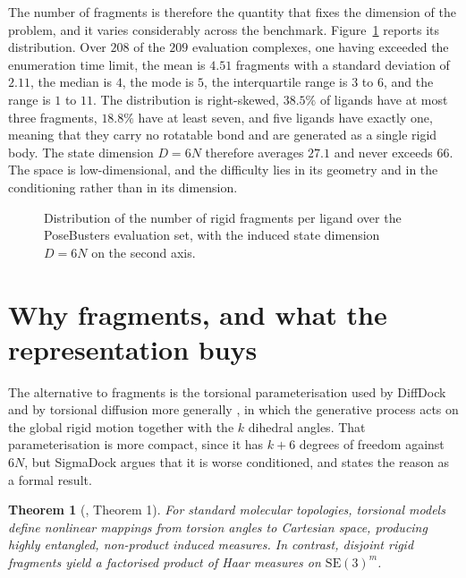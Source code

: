 \documentclass[11pt,a4paper]{report}
\theoremstyle{plain}
\newtheorem{theorem}{Theorem}[chapter]
\theoremstyle{definition}
\theoremstyle{remark}
\newif\ifdraftmode
\newcommand{\figplaceholder}[3]{%
  \begin{figure}[htbp]
  \centering
  \ifdraftmode
    \begin{tcolorbox}[
      width=0.92\textwidth, colback=PanelGrey, colframe=DraftGrey,
      boxrule=0.5pt, sharp corners, halign=flush left]
      \small\sffamily
      \textbf{\color{DraftBlue}FIGURE PLACEHOLDER}\\[3pt]
      #3
    \end{tcolorbox}
  \else
    \fbox{\parbox{0.9\textwidth}{\centering\vspace{2cm}[figure]\vspace{2cm}}}
  \fi
  \caption{#2}
  \label{#1}
  \end{figure}}
\newcommand{\SEthree}{\mathrm{SE}(3)}
\begin{document}
The number of fragments is therefore the quantity that fixes the dimension of
the problem, and it varies considerably across the benchmark.
Figure~\ref{fig:fragment-histogram} reports its distribution. Over $208$ of the
$209$ evaluation complexes, one having exceeded the enumeration time limit,
the mean is $4.51$ fragments with a standard deviation of $2.11$, the median
is $4$, the mode is $5$, the interquartile range is $3$ to $6$, and the range
is $1$ to $11$. The distribution is right-skewed, $38.5\%$ of ligands have at
most three fragments, $18.8\%$ have at least seven, and five ligands have
exactly one, meaning that they carry no rotatable bond and are generated as a
single rigid body. The state dimension $D = 6N$ therefore averages $27.1$ and
never exceeds $66$. The space is low-dimensional, and the difficulty lies in
its geometry and in the conditioning rather than in its dimension.

\figplaceholder{fig:fragment-histogram}
{Distribution of the number of rigid fragments per ligand over the
PoseBusters evaluation set, with the induced state dimension $D = 6N$ on the
second axis.}
{Histogram of fragment count $N$ over the $208$ measured ligands, bars in a
single muted colour, with a cumulative curve overlaid on a secondary axis and
a second top axis labelled $D = 6N$. Annotate mean $4.51$, median $4$ and the
five single-fragment ligands. Source data:
\texttt{Thesis Visualisierungen/data/fragment\_distribution.csv}. This is the
figure that establishes the scale of the generative problem and should be
referred back to whenever fragment count is used as a covariate.}

\section{Why fragments, and what the representation buys}
\label{sec:why-fragments}

The alternative to fragments is the torsional parameterisation used by
DiffDock and by torsional diffusion more generally
\citep{corso2023diffdock,jing2022torsional}, in which the generative process
acts on the global rigid motion together with the $k$ dihedral angles. That
parameterisation is more compact, since it has $k+6$ degrees of freedom
against $6N$, but SigmaDock argues that it is worse conditioned, and states
the reason as a formal result.

\begin{theorem}[\citealp{prat2026sigmadock}, Theorem 1]
\label{thm:product-measure}
For standard molecular topologies, torsional models define nonlinear mappings
from torsion angles to Cartesian space, producing highly entangled,
non-product induced measures. In contrast, disjoint rigid fragments yield a
factorised product of Haar measures on $\SEthree^{m}$.
\end{theorem}
\end{document}

